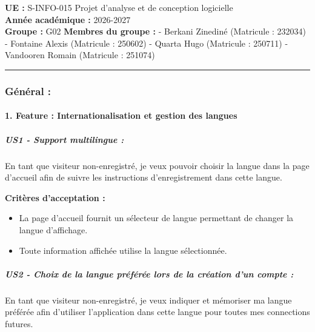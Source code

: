 \textbf{UE :} S-INFO-015 Projet d'analyse et de conception logicielle\\
\textbf{Année académique :} 2026-2027\\
\textbf{Groupe :} G02 \textbf{Membres du groupe :} - Berkani Zinediné
(Matricule : 232034) - Fontaine Alexis (Matricule : 250602) - Quarta Hugo (Matricule
: 250711) - Vandooren Romain (Matricule : 251074)

\begin{center}\rule{0.5\linewidth}{0.5pt}\end{center}

\hypertarget{guxe9nuxe9ral}{%
\subsubsection{Général :}\label{guxe9nuxe9ral}}

\hypertarget{feature-internationalisation-et-gestion-des-langues}{%
\paragraph{1. Feature : Internationalisation et gestion des
langues}\label{feature-internationalisation-et-gestion-des-langues}}

\hypertarget{us1---support-multilingue}{%
\subparagraph{US1 - Support multilingue
:}\label{us1---support-multilingue}}

En tant que visiteur non-enregistré, je veux pouvoir choisir la langue
dans la page d'accueil afin de suivre les instructions d'enregistrement
dans cette langue.

\textbf{Critères d'acceptation :}

\begin{itemize}
\tightlist
\item
  La page d'accueil fournit un sélecteur de langue permettant de changer
  la langue d'affichage.
\item
  Toute information affichée utilise la langue sélectionnée.
\end{itemize}

\hypertarget{us2---choix-de-la-langue-pruxe9fuxe9ruxe9e-lors-de-la-cruxe9ation-dun-compte}{%
\subparagraph{US2 - Choix de la langue préférée lors de la création d'un
compte
:}\label{us2---choix-de-la-langue-pruxe9fuxe9ruxe9e-lors-de-la-cruxe9ation-dun-compte}}

En tant que visiteur non-enregistré, je veux indiquer et mémoriser ma
langue préférée afin d'utiliser l'application dans cette langue pour
toutes mes connections futures.

